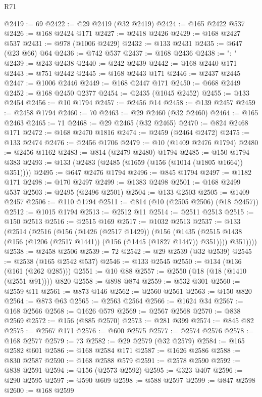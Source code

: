 \begin{lexlean}{R71}
\begin{coremodule}
@2419 := 69
@2422 := @29 @2419 (@32 @2419)
@2424 := @165 @2422 @537
@2426 := @168 @2424 @171
@2427 := @2418 @2426
@2429 := @168 @2427 @537
@2431 := @978 (@1006 @2429)
@2432 := @133 @2431
@2435 := @647 (@23 @66) @64
@2436 := @742 @537
@2437 := @168 @2436
@2438 := ": "
@2439 := @243 @2438
@2440 := @242 @2439
@2442 := @168 @2440 @171
@2443 := @751 @2442
@2445 := @168 @2443 @171
@2446 := @2437 @2445
@2447 := @1006 @2446
@2449 := @168 @2447 @171
@2450 := @668 @2449
@2452 := @168 @2450 @2377
@2454 := @2435 (@1045 @2452)
@2455 := @133 @2454
@2456 := @10 @1794
@2457 := @2456 @14
@2458 := @139 @2457
@2459 := @2458 @1794
@2460 := 70
@2463 := @29 @2460 (@32 @2460)
@2464 := @165 @2463
@2465 := 71
@2468 := @29 @2465 (@32 @2465)
@2470 := @824 @2468 @171
@2472 := @168 @2470 @1816
@2474 := @2459 (@2464 @2472)
@2475 := @133 @2474
@2476 := @2456 @1706
@2479 := @10 (@1409 @2476 @1794)
@2480 := @2456 @1162
@2483 := @814 (@2479 @2480) @1794
@2485 := @150 @1794 @383
@2493 := @133 (@2483 (@2485 (@1659 (@156 (@1014 (@1805 @1664)) @351))))
@2495 := @647 @2476 @1794
@2496 := @845 @1794
@2497 := @1182 @171
@2498 := @170 @2497
@2499 := @1383 @2498
@2501 := @168 @2499 @537
@2503 := @2495 (@2496 @2501)
@2504 := @133 @2503
@2505 := @1409 @2457
@2506 := @110 @1794
@2511 := @814 (@10 (@2505 @2506) (@18 @2457))
@2512 := @1015 @1794
@2513 := @2512 @11
@2514 := @2511 @2513
@2515 := @150 @2513
@2516 := @2515 @169
@2517 := @1032 @2513
@2537 := @133
    (@2514
      (@2516
        (@156
          (@1426 (@2517 @1429))
          (@156
            (@1435 (@2515 @1438 (@156 (@1206 (@2517 @1441)) (@156 (@1445 (@1827 @1447)) @351))))
            @351))))
@2538 := @2458 @2506
@2539 := 72
@2542 := @29 @2539 (@32 @2539)
@2545 := @2538 (@165 @2542 @537)
@2546 := @133 @2545
@2550 := @134 (@136 (@161 (@262 @285)))
@2551 := @10 @88
@2557 := @2550 (@18 (@18 (@1410 (@2551 @91)))) @820
@2558 := @898 @874
@2559 := @532 @301
@2560 := @2559 @11
@2561 := @873 @146
@2562 := @2560 @2561
@2563 := @150 @820
@2564 := @873 @63
@2565 := @2563 @2564
@2566 := @1624 @34
@2567 := @168 @2566
@2568 := @1626 @579
@2569 := @2567 @2568
@2570 := @838 @2569
@2572 := @156 (@885 @2570)
@2573 := @281 @399
@2574 := @845 @82
@2575 := @2567 @171
@2576 := @600 @2575
@2577 := @2574 @2576
@2578 := @168 @2577
@2579 := 73
@2582 := @29 @2579 (@32 @2579)
@2584 := @165 @2582 @601
@2586 := @168 @2584 @171
@2587 := @1626 @2586
@2588 := @830 @2587
@2590 := @168 @2588 @579
@2591 := @2578 @2590
@2592 := @838 @2591
@2594 := @156 (@2573 @2592)
@2595 := @323 @407
@2596 := @290 @2595
@2597 := @590 @609
@2598 := @588 @2597
@2599 := @847 @2598
@2600 := @168 @2599

\end{coremodule}
\end{lexlean}
